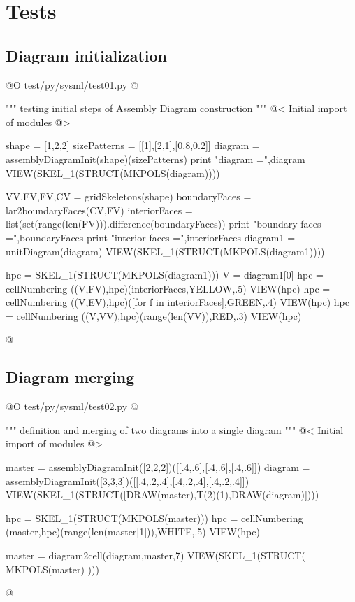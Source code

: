 \documentclass[11pt,oneside]{article}	%
\begin{document}
\section{Tests}
\subsection{Diagram initialization}

@O test/py/sysml/test01.py
@{""" testing initial steps of Assembly Diagram construction """
@< Initial import of modules @>

shape = [1,2,2]
sizePatterns = [[1],[2,1],[0.8,0.2]]
diagram = assemblyDiagramInit(shape)(sizePatterns)
print "\n diagram =",diagram
VIEW(SKEL_1(STRUCT(MKPOLS(diagram))))

VV,EV,FV,CV = gridSkeletons(shape)
boundaryFaces = lar2boundaryFaces(CV,FV)
interiorFaces = list(set(range(len(FV))).difference(boundaryFaces))
print "\n boundary faces =",boundaryFaces
print "\n interior faces =",interiorFaces
diagram1 = unitDiagram(diagram)
VIEW(SKEL_1(STRUCT(MKPOLS(diagram1))))

hpc = SKEL_1(STRUCT(MKPOLS(diagram1)))
V = diagram1[0]
hpc = cellNumbering ((V,FV),hpc)(interiorFaces,YELLOW,.5)
VIEW(hpc)
hpc = cellNumbering ((V,EV),hpc)([for f in interiorFaces],GREEN,.4)
VIEW(hpc)
hpc = cellNumbering ((V,VV),hpc)(range(len(VV)),RED,.3)
VIEW(hpc)

@}

\subsection{Diagram merging}

@O test/py/sysml/test02.py
@{""" definition and merging of two diagrams into a single diagram """
@< Initial import of modules @>

master = assemblyDiagramInit([2,2,2])([[.4,.6],[.4,.6],[.4,.6]])
diagram = assemblyDiagramInit([3,3,3])([[.4,.2,.4],[.4,.2,.4],[.4,.2,.4]])
VIEW(SKEL_1(STRUCT([DRAW(master),T(2)(1),DRAW(diagram)])))

hpc = SKEL_1(STRUCT(MKPOLS(master)))
hpc = cellNumbering (master,hpc)(range(len(master[1])),WHITE,.5)
VIEW(hpc)

master = diagram2cell(diagram,master,7)
VIEW(SKEL_1(STRUCT( MKPOLS(master) )))

@}
\end{document}
